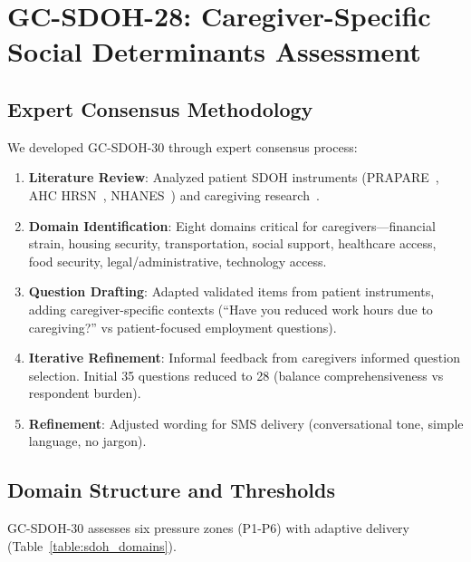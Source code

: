 \documentclass{article}
\begin{document}
\section{GC{-}SDOH{-}28: Caregiver{-}Specific Social Determinants Assessment}%
\label{sec:GC{-}SDOH{-}28Caregiver{-}SpecificSocialDeterminantsAssessment}%
%
\subsection{Expert Consensus Methodology}%
\label{subsec:ExpertConsensusMethodology}%
We developed GC-SDOH-30 through expert consensus process:
\begin{enumerate}
    \item \textbf{Literature Review}: Analyzed patient SDOH instruments (PRAPARE~\cite{prapare}, AHC HRSN~\cite{ahc}, NHANES~\cite{nhanes}) and caregiving research~\cite{aarp2025, bella2006, tebb1995, tebb2013}.
    \item \textbf{Domain Identification}: Eight domains critical for caregivers—financial strain, housing security, transportation, social support, healthcare access, food security, legal/administrative, technology access.
    \item \textbf{Question Drafting}: Adapted validated items from patient instruments, adding caregiver-specific contexts (``Have you reduced work hours due to caregiving?'' vs patient-focused employment questions).
    \item \textbf{Iterative Refinement}: Informal feedback from caregivers informed question selection. Initial 35 questions reduced to 28 (balance comprehensiveness vs respondent burden).
    \item \textbf{Refinement}: Adjusted wording for SMS delivery (conversational tone, simple language, no jargon).
\end{enumerate}

%
\subsection{Domain Structure and Thresholds}%
\label{subsec:DomainStructureandThresholds}%
GC-SDOH-30 assesses six pressure zones (P1-P6) with adaptive delivery (Table~\ref{table:sdoh_domains}).
\end{document}
